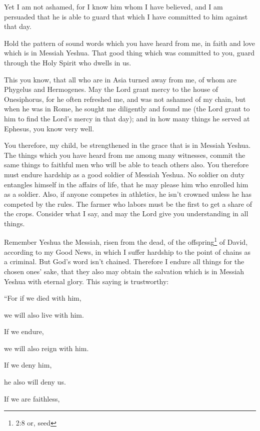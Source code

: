 Yet I am not ashamed, for I know him whom I have believed, and I am persuaded that he is able to guard that which I have committed to him against that day.


\myverse{}Hold the pattern of sound words which you have heard from me, in faith and love which is in Messiah Yeshua. \myverse{}That good thing which was committed to you, guard through the Holy Spirit who dwells in us.


\myverse{}This you know, that all who are in Asia turned away from me, of whom are Phygelus and Hermogenes. \myverse{}May the Lord grant mercy to the house of Onesiphorus, for he often refreshed me, and was not ashamed of my chain, \myverse{}but when he was in Rome, he sought me diligently and found me \myverse{}(the Lord grant to him to find the Lord’s mercy in that day); and in how many things he served at Ephesus, you know very well.


\mychapter{} \myverse*{}You therefore, my child, be strengthened in the grace that is in Messiah Yeshua. \myverse{}The things which you have heard from me among many witnesses, commit the same things to faithful men who will be able to teach others also. \myverse{}You therefore must endure hardship as a good soldier of Messiah Yeshua. \myverse{}No soldier on duty entangles himself in the affairs of life, that he may please him who enrolled him as a soldier. \myverse{}Also, if anyone competes in athletics, he isn’t crowned unless he has competed by the rules. \myverse{}The farmer who labors must be the first to get a share of the crops. \myverse{}Consider what I say, and may the Lord give you understanding in all things.


\myverse{}Remember Yeshua the Messiah, risen from the dead, of the offspring\footnote{2:8 or, seed} of David, according to my Good News, \myverse{}in which I suffer hardship to the point of chains as a criminal. But God’s word isn’t chained. \myverse{}Therefore I endure all things for the chosen ones’ sake, that they also may obtain the salvation which is in Messiah Yeshua with eternal glory. \myverse{}This saying is trustworthy:

“For if we died with him,

we will also live with him.


\myverse{}If we endure,

we will also reign with him.

If we deny him,

he also will deny us.


\myverse{}If we are faithless,


